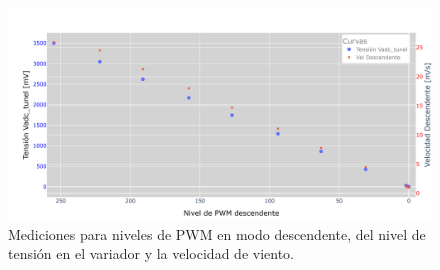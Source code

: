 
\begin{figure}[H]
    \centering
    \includegraphics[width=1\linewidth]{Figuras/datalogger/Hardware/MedicionesPWM/pruebaTunelCicloDes.png}
    \caption{Mediciones para niveles de PWM en modo descendente, del nivel de tensión en el variador y la velocidad de viento.}
    \label{fig:pruebaTunelCicloDes}
\end{figure}

